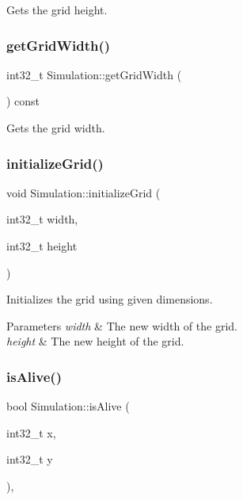 Gets the grid height. 

\mbox{\label{class_simulation_a407aec90b481c057000ac432594eb4f9}} 
\subsubsection{\texorpdfstring{getGridWidth()}{getGridWidth()}}
{\footnotesize\ttfamily int32\+\_\+t Simulation\+::get\+Grid\+Width (\begin{DoxyParamCaption}{ }\end{DoxyParamCaption}) const}



Gets the grid width. 

\mbox{\label{class_simulation_ab07da37d80b50e6d52ae0697746f3afa}} 
\subsubsection{\texorpdfstring{initializeGrid()}{initializeGrid()}}
{\footnotesize\ttfamily void Simulation\+::initialize\+Grid (\begin{DoxyParamCaption}\item[{int32\+\_\+t}]{width,  }\item[{int32\+\_\+t}]{height }\end{DoxyParamCaption})}



Initializes the grid using given dimensions. 


\begin{DoxyParams}{Parameters}
{\em width} & The new width of the grid.\\
\hline
{\em height} & The new height of the grid.\\
\hline
\end{DoxyParams}
\mbox{\label{class_simulation_abcacd825d905eb8ff9b2cad4fdf76bdd}} 
\subsubsection{\texorpdfstring{isAlive()}{isAlive()}}
{\footnotesize\ttfamily bool Simulation\+::is\+Alive (\begin{DoxyParamCaption}\item[{int32\+\_\+t}]{x,  }\item[{int32\+\_\+t}]{y }\end{DoxyParamCaption})\hspace{0.3cm}{\ttfamily [protected]}, {\ttfamily [virtual]}}



